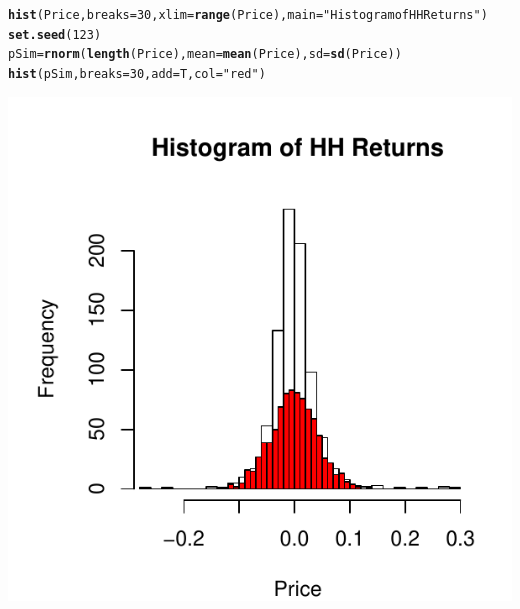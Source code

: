 \documentclass[10pt]{article}\usepackage[]{graphicx}\usepackage[]{color}
\makeatletter
\def\maxwidth{ %
  \ifdim\Gin@nat@width>\linewidth
    \linewidth
  \else
    \Gin@nat@width
  \fi
}
\newcommand{\hlnum}[1]{\textcolor[rgb]{0.686,0.059,0.569}{#1}}%
\newcommand{\hlstr}[1]{\textcolor[rgb]{0.192,0.494,0.8}{#1}}%
\newcommand{\hlstd}[1]{\textcolor[rgb]{0.345,0.345,0.345}{#1}}%
\newcommand{\hlkwb}[1]{\textcolor[rgb]{0.69,0.353,0.396}{#1}}%
\newcommand{\hlkwc}[1]{\textcolor[rgb]{0.333,0.667,0.333}{#1}}%
\newcommand{\hlkwd}[1]{\textcolor[rgb]{0.737,0.353,0.396}{\textbf{#1}}}%
\newenvironment{kframe}{%
 \def\at@end@of@kframe{}%
 \ifinner\ifhmode%
  \def\at@end@of@kframe{\end{minipage}}%
  \begin{minipage}{\columnwidth}%
 \fi\fi%
 \def\FrameCommand##1{\hskip\@totalleftmargin \hskip-\fboxsep
 \colorbox{shadecolor}{##1}\hskip-\fboxsep
     \hskip-\linewidth \hskip-\@totalleftmargin \hskip\columnwidth}%
 \MakeFramed {\advance\hsize-\width
   \@totalleftmargin\z@ \linewidth\hsize
   \@setminipage}}%
 {\par\unskip\endMakeFramed%
 \at@end@of@kframe}
\newenvironment{knitrout}{}{} %
\makeatother
\begin{document}
\begin{knitrout}
{}


\begin{kframe}\begin{alltt}
\hlkwd{hist}\hlstd{(Price,} \hlkwc{breaks} \hlstd{=} \hlnum{30}\hlstd{,} \hlkwc{xlim} \hlstd{=} \hlkwd{range}\hlstd{(Price),} \hlkwc{main} \hlstd{=} \hlstr{"Histogram of HH Returns"}\hlstd{)}
\hlkwd{set.seed}\hlstd{(}\hlnum{123}\hlstd{)}
\hlstd{pSim} \hlkwb{=} \hlkwd{rnorm}\hlstd{(}\hlkwd{length}\hlstd{(Price),} \hlkwc{mean} \hlstd{=} \hlkwd{mean}\hlstd{(Price),} \hlkwc{sd} \hlstd{=} \hlkwd{sd}\hlstd{(Price))}
\hlkwd{hist}\hlstd{(pSim,} \hlkwc{breaks} \hlstd{=} \hlnum{30}\hlstd{,} \hlkwc{add} \hlstd{= T,} \hlkwc{col} \hlstd{=} \hlstr{"red"}\hlstd{)}
\end{alltt}
\end{kframe}

{\centering \includegraphics[width=\maxwidth]{figure/unnamed-chunk-42} 

}



\end{knitrout}
\end{document}
